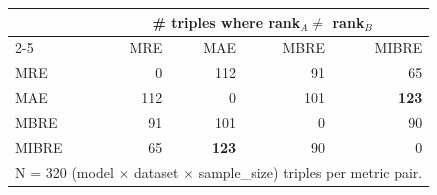 \begin{tabular}{lrrrr}
\toprule
 & \multicolumn{4}{c}{\# triples where rank$_A \neq$ rank$_B$} \\
\cmidrule{2-5}
 & MRE & MAE & MBRE & MIBRE \\
\midrule
MRE & 0 & 112 & 91 & 65 \\
MAE & 112 & 0 & 101 & \textbf{123} \\
MBRE & 91 & 101 & 0 & 90 \\
MIBRE & 65 & \textbf{123} & 90 & 0 \\
\bottomrule
\multicolumn{5}{l}{\footnotesize N = 320 (model $\times$ dataset $\times$ sample\_size) triples per metric pair.}
\end{tabular}
